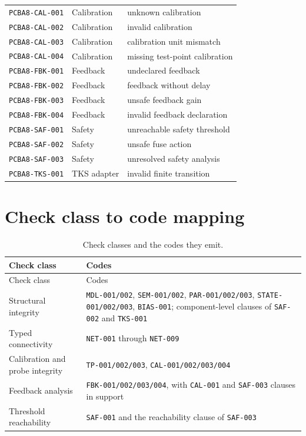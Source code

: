 \begin{longtable}{@{}lll@{}}
\texttt{PCBA8-CAL-001} & Calibration & unknown calibration \\
\texttt{PCBA8-CAL-002} & Calibration & invalid calibration \\
\texttt{PCBA8-CAL-003} & Calibration & calibration unit mismatch \\
\texttt{PCBA8-CAL-004} & Calibration & missing test-point calibration \\
\texttt{PCBA8-FBK-001} & Feedback & undeclared feedback \\
\texttt{PCBA8-FBK-002} & Feedback & feedback without delay \\
\texttt{PCBA8-FBK-003} & Feedback & unsafe feedback gain \\
\texttt{PCBA8-FBK-004} & Feedback & invalid feedback declaration \\
\texttt{PCBA8-SAF-001} & Safety & unreachable safety threshold \\
\texttt{PCBA8-SAF-002} & Safety & unsafe fuse action \\
\texttt{PCBA8-SAF-003} & Safety & unresolved safety analysis \\
\texttt{PCBA8-TKS-001} & TKS adapter & invalid finite transition \\
\end{longtable}

\section{Check class to code mapping}\label{appA:classmap}

\begin{longtable}{@{}ll@{}}
\caption{Check classes and the codes they emit.}\label{appA:classtable}\\
\toprule
Check class & Codes \\
\midrule
\endfirsthead
\toprule
Check class & Codes \\
\midrule
\endhead
\bottomrule
\endfoot
Structural integrity & \texttt{MDL-001/002}, \texttt{SEM-001/002}, \texttt{PAR-001/002/003}, \texttt{STATE-001/002/003}, \texttt{BIAS-001}; component-level clauses of \texttt{SAF-002} and \texttt{TKS-001} \\
Typed connectivity & \texttt{NET-001} through \texttt{NET-009} \\
Calibration and probe integrity & \texttt{TP-001/002/003}, \texttt{CAL-001/002/003/004} \\
Feedback analysis & \texttt{FBK-001/002/003/004}, with \texttt{CAL-001} and \texttt{SAF-003} clauses in support \\
Threshold reachability & \texttt{SAF-001} and the reachability clause of \texttt{SAF-003} \\
\end{longtable}

